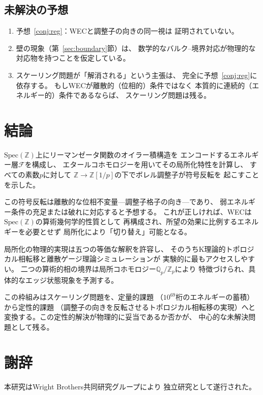 \documentclass[11pt,a4paper]{article}
\newcommand{\Spec}{\mathrm{Spec}}
\newcommand{\Zp}{\mathbb{Z}[1/p]}
\newcommand{\Qp}{\mathbb{Q}_p}
\begin{document}
\subsection{未解決の予想}

\begin{enumerate}
  \item 予想~\ref{conj:reg}：WECと調整子の向きの同一視は
    証明されていない。
  \item 壁の現象（第~\ref{sec:boundary}節）は、
    数学的なバルク--境界対応が物理的な対応物を持つことを仮定している。
  \item スケーリング問題が「解消される」という主張は、
    完全に予想~\ref{conj:reg}に依存する。
    もしWECが離散的（位相的）条件ではなく
    本質的に連続的（エネルギー的）条件であるならば、
    スケーリング問題は残る。
\end{enumerate}

\section{結論}
\label{sec:conclusion}

$\Spec(\mathbb{Z})$上にリーマンゼータ関数のオイラー積構造を
エンコードするエネルギー層$\mathcal{F}$を構成し、
エタールコホモロジーを用いてその局所化特性を計算し、
すべての素数$p$に対して
$\mathbb{Z} \to \Zp$の下でボレル調整子が符号反転を
起こすことを示した。

この符号反転は離散的な位相不変量---調整子格子の向き---であり、
弱エネルギー条件の充足または破れに対応すると予想する。
これが正しければ、WECは$\Spec(\mathbb{Z})$の算術幾何学的性質として
再構成され、所望の効果に比例するエネルギーを必要とせず
局所化により「切り替え」可能となる。

局所化の物理的実現は五つの等価な解釈を許容し、
そのうちK理論的トポロジカル相転移と離散ゲージ理論シミュレーションが
実験的に最もアクセスしやすい。
二つの算術的相の境界は局所コホモロジー$\Qp/\mathbb{Z}_p$により
特徴づけられ、具体的なエッジ状態現象を予測する。

この枠組みはスケーリング問題を、定量的課題
（$10^{69}$桁のエネルギーの蓄積）から定性的課題
（調整子の向きを反転させるトポロジカル相転移の実現）へと
変換する。この定性的解決が物理的に妥当であるか否かが、
中心的な未解決問題として残る。

\section*{謝辞}
本研究はWright Brothers共同研究グループにより
独立研究として遂行された。
\end{document}
